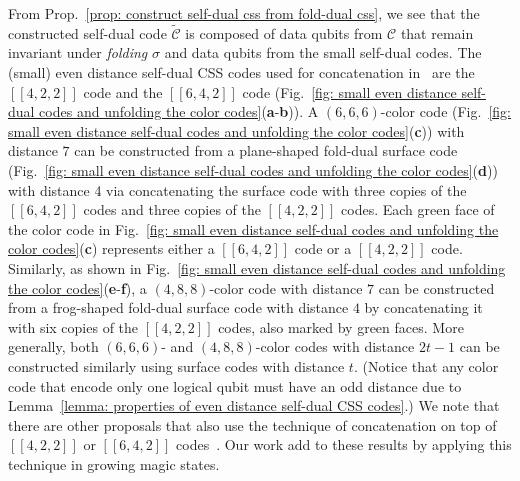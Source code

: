\documentclass[reprint,aps,twocolumn,superscriptaddress,showpacs,notitlepage,10pt]{revtex4-2}
\theoremstyle{definition}
\begin{document}
From Prop.~\ref{prop: construct self-dual css from fold-dual css}, we see that the constructed self-dual code $\tilde{\mathcal{C}}$ is composed of data qubits from $\mathcal{C}$ that remain invariant under \textit{folding} $\sigma$ and data qubits from the small self-dual codes. The (small) even distance self-dual CSS codes used for concatenation in~\cite{criger_concatenated_toric_code_2016} are the $[[4,2,2]]$ code and the $[[6,4,2]]$ code (Fig.~\ref{fig: small even distance self-dual codes and unfolding the color codes}(\textbf{a}-\textbf{b})). A $(6,6,6)$-color code (Fig.~\ref{fig: small even distance self-dual codes and unfolding the color codes}(\textbf{c})) with distance $7$ can be constructed from a plane-shaped fold-dual surface code (Fig.~\ref{fig: small even distance self-dual codes and unfolding the color codes}(\textbf{d})) with distance 4 via concatenating the surface code with three copies of the $[[6,4,2]]$ codes and three copies of the $[[4,2,2]]$ codes. Each green face of the color code in Fig.~\ref{fig: small even distance self-dual codes and unfolding the color codes}(\textbf{c}) represents either a $[[6,4,2]]$ code or a $[[4,2,2]]$ code. Similarly, as shown in Fig.~\ref{fig: small even distance self-dual codes and unfolding the color codes}(\textbf{e}-\textbf{f}), a $(4,8,8)$-color code with distance $7$ can be constructed from a frog-shaped fold-dual surface code with distance $4$ by concatenating it with six copies of the $[[4,2,2]]$ codes, also marked by green faces. More generally, both $(6,6,6)$- and $(4,8,8)$-color codes with distance $2t-1$ can be constructed similarly using surface codes with distance $t$. (Notice that any color code that encode only one logical qubit must have an odd distance due to Lemma~\ref{lemma: properties of even distance self-dual CSS codes}.) We note that there are other proposals that also use the technique of concatenation on top of $[[4,2,2]]$ or $[[6,4,2]]$ codes~\cite{knill_2005,yoshida2024concatenatecodessavequbits,goto_2024,berthusen2025adaptivesyndromeextraction}. Our work add to these results by applying this technique in growing magic states.  


 
\end{document}
